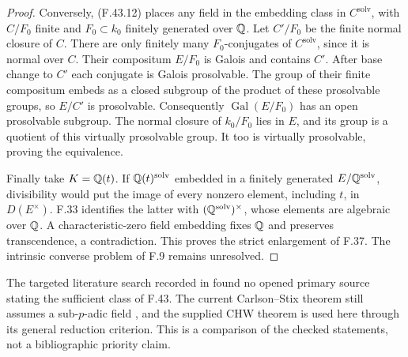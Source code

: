 \begin{proof}
Conversely, (F.43.12) places any
field in the embedding class in
$C^{\mathrm{solv}}$, with
$C/F_0$ finite and
$F_0\subset k_0$ finitely
generated over $\mathbb Q$. Let
$C'/F_0$ be the finite normal
closure of $C$. There are only
finitely many $F_0$-conjugates
of $C^{\mathrm{solv}}$, since
it is normal over $C$.
Their compositum $E/F_0$ is
Galois and contains $C'$.
After base change to $C'$ each
conjugate is Galois prosolvable.
The group of their finite
compositum embeds as a closed
subgroup of the product of
these prosolvable groups, so
$E/C'$ is prosolvable.
Consequently $\operatorname{Gal}(E/F_0)$
has an open prosolvable subgroup.
The normal closure of $k_0/F_0$
lies in $E$, and its group is
a quotient of this virtually
prosolvable group. It too is
virtually prosolvable, proving
the equivalence.

Finally take $K=\mathbb Q(t)$.
If $\mathbb Q(t)^{\mathrm{solv}}$
embedded in a finitely generated
$E/\mathbb Q^{\mathrm{solv}}$, divisibility
would put the image of every
nonzero element, including $t$,
in $D(E^\times)$.
F.33 identifies the latter with
$(\mathbb Q^{\mathrm{solv}})^\times$,
whose elements are algebraic
over $\mathbb Q$. A characteristic-zero
field embedding fixes $\mathbb Q$ and
preserves transcendence, a
contradiction. This proves the
strict enlargement of F.37.
The intrinsic converse problem
of F.9 remains unresolved.
\end{proof}

The targeted literature search recorded in
 found no opened primary source
stating the sufficient class of F.43. The current
Carlson--Stix theorem still assumes a sub-$p$-adic
field \citep[Theorem~A]{F_CS2026}, and the supplied
CHW theorem is used here through its general reduction
criterion. This is a comparison of the checked
statements, not a bibliographic priority claim.
